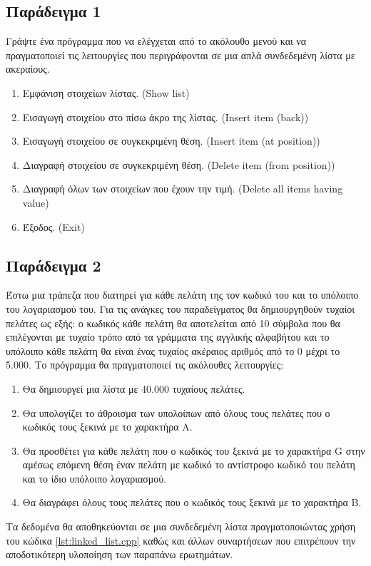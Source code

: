 \subsection{Παράδειγμα 1}
Γράψτε ένα πρόγραμμα που να ελέγχεται από το ακόλουθο μενού και να πραγματοποιεί τις λειτουργίες που περιγράφονται σε μια απλά συνδεδεμένη λίστα με ακεραίους.
\begin{enumerate}[nolistsep]
\item Εμφάνιση στοιχείων λίστας. (Show list)
\item Εισαγωγή στοιχείου στο πίσω άκρο της λίστας. (Insert item (back))
\item Εισαγωγή στοιχείου σε συγκεκριμένη θέση. (Insert item (at position)) 
\item Διαγραφή στοιχείου σε συγκεκριμένη θέση. (Delete item (from position))
\item Διαγραφή όλων των στοιχείων που έχουν την τιμή. (Delete all items having value)
\item Έξοδος. (Exit)
\end{enumerate}






\subsection{Παράδειγμα 2}
Έστω μια τράπεζα που διατηρεί για κάθε πελάτη της τον κωδικό του και το υπόλοιπο του λογαριασμού του. Για τις ανάγκες του παραδείγματος θα δημιουργηθούν τυχαίοι πελάτες ως εξής: ο κωδικός κάθε πελάτη θα αποτελείται από 10 σύμβολα που θα επιλέγονται με τυχαίο τρόπο από τα γράμματα της αγγλικής αλφαβήτου και το υπόλοιπο κάθε πελάτη θα είναι ένας τυχαίος ακέραιος αριθμός από το 0 μέχρι το 5.000. Το πρόγραμμα θα πραγματοποιεί τις ακόλουθες λειτουργίες: 
\begin{enumerate}[noitemsep,label=\Alph*]
\item Θα δημιουργεί μια λίστα με 40.000 τυχαίους πελάτες.
\item Θα υπολογίζει το άθροισμα των υπολοίπων από όλους τους πελάτες που ο κωδικός τους ξεκινά με το χαρακτήρα Α.
\item Θα προσθέτει για κάθε πελάτη που ο κωδικός του ξεκινά με το χαρακτήρα G στην αμέσως επόμενη θέση έναν πελάτη με κωδικό το αντίστροφο κωδικό του πελάτη και το ίδιο υπόλοιπο λογαριασμού.
\item Θα διαγράφει όλους τους πελάτες που ο κωδικός τους ξεκινά με το χαρακτήρα Β.
\end{enumerate}
Τα δεδομένα θα αποθηκεύονται σε μια συνδεδεμένη λίστα πραγματοποιώντας χρήση του κώδικα \ref{lst:linked_list.cpp} καθώς και άλλων συναρτήσεων που επιτρέπουν την αποδοτικότερη υλοποίηση των παραπάνω ερωτημάτων.

